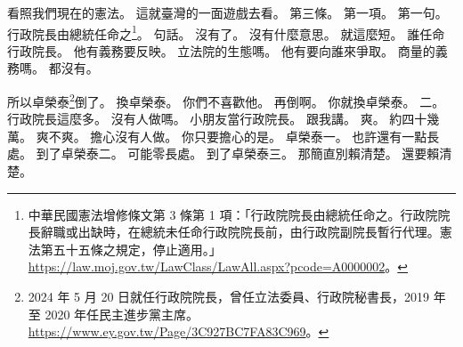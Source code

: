 \hypertarget{c01:cue:1370}{}看照我們現在的憲法。
\hypertarget{c01:cue:1371}{}這就臺灣的一面遊戲去看。
\hypertarget{c01:cue:1372}{}第三條。
\hypertarget{c01:cue:1373}{}第一項。
\hypertarget{c01:cue:1374}{}第一句。
\hypertarget{c01:cue:1375}{}行政院長由總統任命之\footnote{中華民國憲法增修條文第 3 條第 1 項：「行政院院長由總統任命之。行政院院長辭職或出缺時，在總統未任命行政院院長前，由行政院副院長暫行代理。憲法第五十五條之規定，停止適用。」\url{https://law.moj.gov.tw/LawClass/LawAll.aspx?pcode=A0000002}。}。
\hypertarget{c01:cue:1376}{}句話。
\hypertarget{c01:cue:1377}{}沒有了。
\hypertarget{c01:cue:1378}{}沒有什麼意思。
\hypertarget{c01:cue:1379}{}就這麼短。
\hypertarget{c01:cue:1380}{}誰任命行政院長。
\hypertarget{c01:cue:1381}{}他有義務要反映。
\hypertarget{c01:cue:1382}{}立法院的生態嗎。
\hypertarget{c01:cue:1383}{}他有要向誰來爭取。
\hypertarget{c01:cue:1384}{}商量的義務嗎。
\hypertarget{c01:cue:1385}{}都沒有。

\hypertarget{c01:cue:1386}{}所以卓榮泰\footnote{2024 年 5 月 20 日就任行政院院長，曾任立法委員、行政院秘書長，2019 年至 2020 年任民主進步黨主席。\url{https://www.ey.gov.tw/Page/3C927BC7FA83C969}。}倒了。
\hypertarget{c01:cue:1387}{}換卓榮泰。
\hypertarget{c01:cue:1388}{}你們不喜歡他。
\hypertarget{c01:cue:1389}{}再倒啊。
\hypertarget{c01:cue:1390}{}你就換卓榮泰。
\hypertarget{c01:cue:1391}{}二。
\hypertarget{c01:cue:1392}{}行政院長這麼多。
\hypertarget{c01:cue:1393}{}沒有人做嗎。
\hypertarget{c01:cue:1394}{}小朋友當行政院長。
\hypertarget{c01:cue:1395}{}跟我講。
\hypertarget{c01:cue:1396}{}爽。
\hypertarget{c01:cue:1397}{}約四十幾萬。
\hypertarget{c01:cue:1398}{}爽不爽。
\hypertarget{c01:cue:1399}{}擔心沒有人做。
\hypertarget{c01:cue:1400}{}你只要擔心的是。
\hypertarget{c01:cue:1401}{}卓榮泰一。
\hypertarget{c01:cue:1402}{}也許還有一點長處。
\hypertarget{c01:cue:1403}{}到了卓榮泰二。
\hypertarget{c01:cue:1404}{}可能零長處。
\hypertarget{c01:cue:1405}{}到了卓榮泰三。
\hypertarget{c01:cue:1406}{}那簡直別賴清楚。
\hypertarget{c01:cue:1407}{}還要賴清楚。

